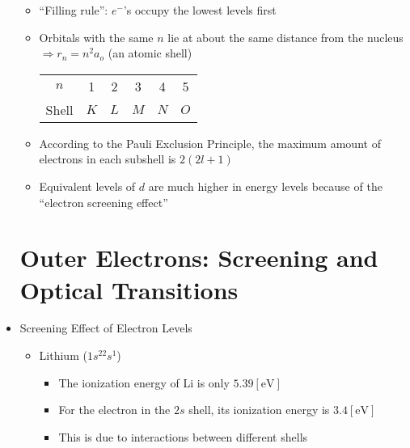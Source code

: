 \begin{itemize}
\begin{itemize}
      \item ``Filling rule'': $e^-$'s occupy the lowest levels first

      \item Orbitals with the same $n$ lie at about the same distance from the nucleus $\Longrightarrow r_n=n^2a_o$ (an atomic shell)

        \begin{center}
          \begin{tabular}[h!]{c c c c c c}
            $n$ & 1 & 2 & 3 & 4 & 5 \\
            Shell & $K$ & $L$ & $M$ & $N$ & $O$\\
          \end{tabular}
        \end{center}

      \item According to the Pauli Exclusion Principle, the maximum amount of electrons in each subshell is $2(2l+1)$

      \item Equivalent levels of $d$ are much higher in energy levels because of the ``electron screening effect''

    \end{itemize}

    \section{Outer Electrons: Screening and Optical Transitions}

  \item Screening Effect of Electron Levels

    \begin{itemize}

      \item Lithium ($1s^22s^1$)

        \begin{itemize}

          \item The ionization energy of Li is only $5.39[\si{\eV}]$

          \item For the electron in the $2s$ shell, its ionization energy is $3.4[\si{\eV}]$

          \item This is due to interactions between different shells

        \end{itemize}


\end{itemize}
\end{itemize}
